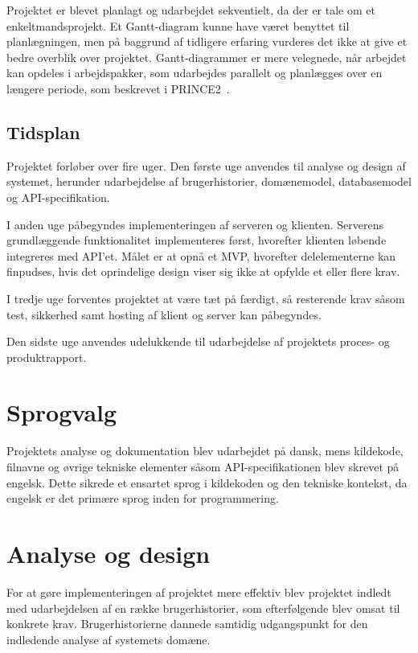 \documentclass[a4paper, 11pt]{article}
\begin{document}
Projektet er blevet planlagt og udarbejdet sekventielt, da der er tale om et enkeltmandsprojekt.
Et Gantt-diagram kunne have været benyttet til planlægningen, men på baggrund af tidligere
erfaring vurderes det ikke at give et bedre overblik over projektet. Gantt-diagrammer er mere
velegnede, når arbejdet kan opdeles i arbejdspakker, som udarbejdes parallelt og planlægges
over en længere periode, som beskrevet i PRINCE2~\cite{prince2_work_package}.

\subsection{Tidsplan}

Projektet forløber over fire uger. Den første uge anvendes til analyse og design af systemet,
herunder udarbejdelse af brugerhistorier, domænemodel, databasemodel og API-specifikation.

I anden uge påbegyndes implementeringen af serveren og klienten. Serverens grundlæggende
funktionalitet implementeres først, hvorefter klienten løbende integreres med API'et. Målet
er at opnå et MVP, hvorefter delelementerne kan finpudses, hvis det oprindelige design viser
sig ikke at opfylde et eller flere krav.

I tredje uge forventes projektet at være tæt på færdigt, så resterende krav såsom test,
sikkerhed samt hosting af klient og server kan påbegyndes.

Den sidste uge anvendes udelukkende til udarbejdelse af projektets proces- og produktrapport.

\section{Sprogvalg}

Projektets analyse og dokumentation blev udarbejdet på dansk, mens kildekode, filnavne og øvrige
tekniske elementer såsom API-specifikationen blev skrevet på engelsk. Dette sikrede et ensartet
sprog i kildekoden og den tekniske kontekst, da engelsk er det primære sprog inden for
programmering.

\section{Analyse og design}
\label{sec:analyse_design}

For at gøre implementeringen af projektet mere effektiv blev projektet indledt med
udarbejdelsen af en række brugerhistorier, som efterfølgende blev omsat til konkrete krav.
Brugerhistorierne dannede samtidig udgangspunkt for den indledende analyse af systemets
domæne.
\end{document}
